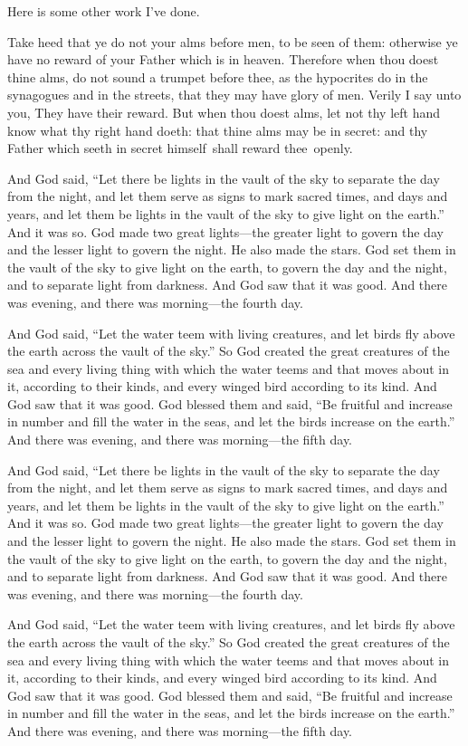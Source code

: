 \documentclass{grattanAlpha}
\begin{document}
Here is some other work I've done.

Take heed that ye do not your alms before men, to be seen of them: otherwise ye have no reward of your Father which is in heaven.
Therefore when thou doest thine alms, do not sound a trumpet before thee, as the hypocrites do in the synagogues and in the streets, that they may have glory of men.
Verily I say unto you, They have their reward.  
But when thou doest alms, let not thy left hand know what thy right hand doeth: that thine alms may be in secret: and thy Father which seeth in secret himself~shall reward thee~openly.

And God said, “Let there be lights in the vault of the sky to separate the day from the night, and let them serve as signs to mark sacred times, and days and years, and let them be lights in the vault of the sky to give light on the earth.”
And it was so.
God made two great lights—the greater light to govern the day and the lesser light to govern the night.
He also made the stars.
God set them in the vault of the sky to give light on the earth, to govern the day and the night, and to separate light from darkness.
And God saw that it was good.
And there was evening, and there was morning—the fourth day.

And God said, “Let the water teem with living creatures, and let birds fly above the earth across the vault of the sky.”
So God created the great creatures of the sea and every living thing with which the water teems and that moves about in it, according to their kinds, and every winged bird according to its kind.
And God saw that it was good.
God blessed them and said, “Be fruitful and increase in number and fill the water in the seas, and let the birds increase on the earth.”
And there was evening, and there was morning—the fifth day.

And God said, “Let there be lights in the vault of the sky to separate the day from the night, and let them serve as signs to mark sacred times, and days and years, and let them be lights in the vault of the sky to give light on the earth.”
And it was so.
God made two great lights—the greater light to govern the day and the lesser light to govern the night.
He also made the stars.
God set them in the vault of the sky to give light on the earth, to govern the day and the night, and to separate light from darkness.
And God saw that it was good.
And there was evening, and there was morning—the fourth day.

And God said, “Let the water teem with living creatures, and let birds fly above the earth across the vault of the sky.”
So God created the great creatures of the sea and every living thing with which the water teems and that moves about in it, according to their kinds, and every winged bird according to its kind.
And God saw that it was good.
God blessed them and said, “Be fruitful and increase in number and fill the water in the seas, and let the birds increase on the earth.”
And there was evening, and there was morning—the fifth day.
\end{document}
